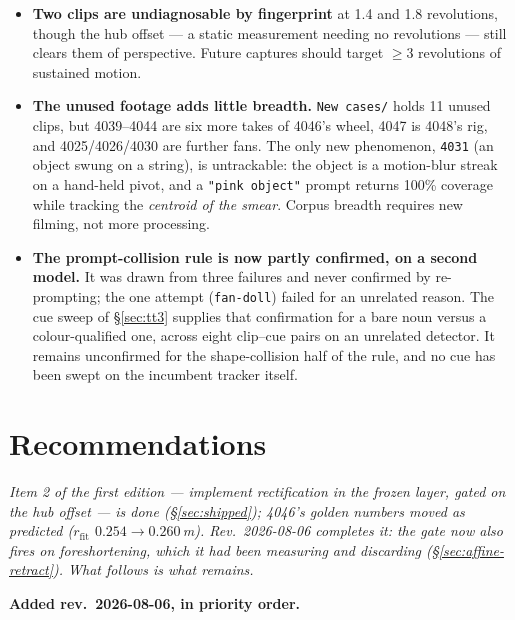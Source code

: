 \documentclass[11pt,a4paper]{article}
\begin{document}
\begin{itemize}
  \item \textbf{Two clips are undiagnosable by fingerprint} at 1.4 and 1.8 revolutions, though
  the hub offset --- a static measurement needing no revolutions --- still clears them of
  perspective. Future captures should target $\ge 3$ revolutions of sustained motion.
  \item \textbf{The unused footage adds little breadth.} \texttt{New cases/} holds 11 unused
  clips, but 4039--4044 are six more takes of 4046's wheel, 4047 is 4048's rig, and 4025/4026/4030
  are further fans. The only new phenomenon, \texttt{4031} (an object swung on a string), is
  untrackable: the object is a motion-blur streak on a hand-held pivot, and a \texttt{"pink
  object"} prompt returns 100\% coverage while tracking the \emph{centroid of the smear}. Corpus
  breadth requires new filming, not more processing.
  \item \textbf{The prompt-collision rule is now partly confirmed, on a second model.} It was
  drawn from three failures and never confirmed by re-prompting; the one attempt
  (\texttt{fan-doll}) failed for an unrelated reason. The cue sweep of \S\ref{sec:tt3} supplies
  that confirmation for a bare noun versus a colour-qualified one, across eight clip--cue pairs on
  an unrelated detector. It remains unconfirmed for the shape-collision half of the rule, and no
  cue has been swept on the incumbent tracker itself.
\end{itemize}

\section{Recommendations}
\label{sec:recs}

\emph{Item 2 of the first edition --- implement rectification in the frozen layer, gated on the hub
offset --- is done (\S\ref{sec:shipped}); 4046's golden numbers moved as predicted
($r_{\mathrm{fit}}$ $0.254 \rightarrow 0.260$\,m). Rev.\ 2026-08-06 completes it: the gate now
also fires on \emph{foreshortening}, which it had been measuring and discarding
(\S\ref{sec:affine-retract}). What follows is what remains.}

\textbf{Added rev.\ 2026-08-06, in priority order.}
\end{document}
